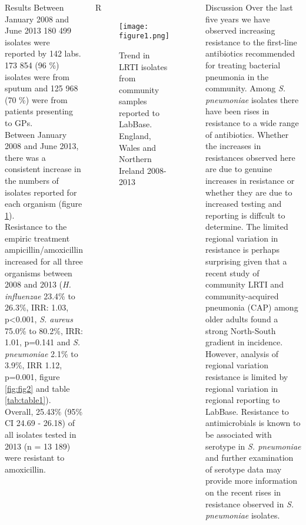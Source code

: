 \documentclass[final, 14pt]{beamer}
\begin{document}
\begin{frame}
\begin{columns}[t]
  \begin{block}{Results}
   Between January 2008 and June 2013 180 499 isolates were reported by 142 labs. 
   173 854 (96 \%) isolates were from sputum and 125 968 (70 \%) were from patients presenting to GPs. \\
   Between January 2008 and June 2013, there was a consistent increase in the numbers of isolates reported for each organism (figure \ref{fig:fig1}).\\
Resistance to the empiric treatment ampicillin/amoxicillin increased for all three organisms between 2008 and 2013 (\textit{H. influenzae} 23.4\% to 26.3\%, IRR: 1.03, p\textless0.001, \textit{S. aureus} 75.0\% to 80.2\%, IRR: 1.01, p=0.141 and \textit{S. pneumoniae} 2.1\% to 3.9\%, IRR 1.12, p=0.001, figure \ref{fig:fig2} and table \ref{tab:table1}).\\
   Overall, 25.43\% (95\% CI 24.69 - 26.18) of all isolates tested in 2013 (n = 13 189) were resistant to amoxicillin. %
  \end{block}
  
 \begin{block}{\textcolor{comp_blue}{R}}
  \begin{figure}
   \texttt{[image: figure1.png]}
   \caption{Trend in LRTI isolates from community samples reported to LabBase. England, Wales and Northern Ireland 2008-2013}
   \label{fig:fig1}
   \end{figure}
\end{block}


  \begin{block}{Discussion}
  Over the last five years we have observed increasing resistance to the first-line antibiotics recommended for treating bacterial pneumonia in the community.
Among \textit{S. pneumoniae} isolates there have been rises in resistance to a wide range of antibiotics. 
Whether the increases in resistances observed here are due to genuine increases in resistance or whether they are due to increased testing and reporting is diffcult to determine. 
The limited regional variation in resistance is perhaps surprising given that a recent study of community LRTI and community-acquired pneumonia (CAP) among older adults found a strong North-South gradient in incidence. \citep{Millett2013}
However, analysis of regional variation resistance is limited by regional variation in regional reporting to LabBase. 
Resistance to antimicrobials is known to be associated with serotype in \textit{S. pneumoniae} and further examination of serotype data may provide more information on the recent rises in resistance observed in \textit{S. pneumoniae} isolates.
  \end{block}    
  

\end{columns}
\end{frame}
\end{document}

